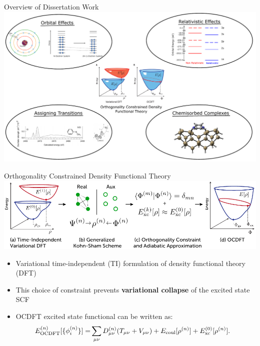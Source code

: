 \documentclass[t]{beamer}
\begin{document}
\begin{frame}{Overview of Dissertation Work}
\centering
\includegraphics[width=\linewidth]{dissertation_work_overview.pdf}
\end{frame}

\begin{frame}{Orthogonality Constrained Density Functional Theory}
\centering
\includegraphics[width=\linewidth]{figure_1.pdf}
\begin{itemize}
\item Variational time-independent (TI) formulation of density functional theory (DFT)\footnotemark
\item This choice of constraint prevents \textbf{variational collapse} of the excited state SCF
\item OCDFT excited state functional can be written as:
\begin{align}
\nonumber
E^{(n)}_{\rm OCDFT}[\{\phi^{(n)}_i\}]=& \sum_{\mu \nu} D^{(n)}_{\mu \nu}(T_{\mu \nu} + V_{\mu \nu}) + E_{\rm coul}[\rho^{(n)}] + E^{(0)}_{\rm xc}[\rho^{(n)}]. 
\end{align}
\end{itemize}
\end{frame}
\end{document}
